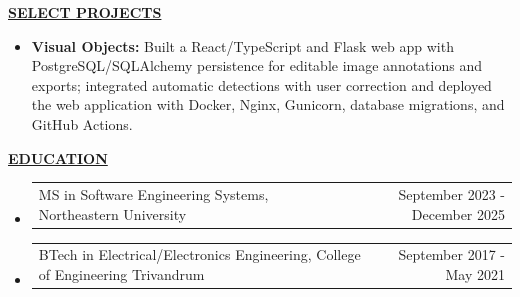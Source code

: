 \documentclass[letterpaper,10pt]{article}
\makeatletter
\newcommand{\resumeSection}[1]{%
  \vspace{12.2bp}
  {\bfseries\underline{#1}}\par
}
\newcommand{\resumeItemListStart}{%
  \begin{itemize}[
    leftmargin=36bp,
    labelindent=18.8bp,
    labelwidth=4.2bp,
    labelsep=13bp,
    topsep=0pt,
    partopsep=0pt,
    parsep=0pt,
    itemsep=0pt
  ]
}
\newcommand{\resumeItemListEnd}{\end{itemize}}
\newcommand{\resumeItem}[1]{\item #1}
\newcommand{\resumeProject}[2]{\resumeItem{\textbf{#1:} #2}}
\newcommand{\resumeEducationItem}[2]{%
  \item
  \begin{tabular*}{\linewidth}{@{}l@{\extracolsep{\fill}}r@{}}
    #1 & #2
  \end{tabular*}%
}
\makeatother
\begin{document}
\resumeSection{SELECT PROJECTS}
\resumeItemListStart
  \resumeProject{Visual Objects}{Built a React/TypeScript and Flask web app with PostgreSQL/SQLAlchemy persistence for editable image annotations and exports; integrated automatic detections with user correction and deployed the web application with Docker, Nginx, Gunicorn, database migrations, and GitHub Actions.}
\resumeItemListEnd

\resumeSection{EDUCATION}
\resumeItemListStart
  \resumeEducationItem{MS in Software Engineering Systems, Northeastern University}{September 2023 - December 2025}
  \resumeEducationItem{BTech in Electrical/Electronics Engineering, College of Engineering Trivandrum}{September 2017 - May 2021}
\resumeItemListEnd
\end{document}
